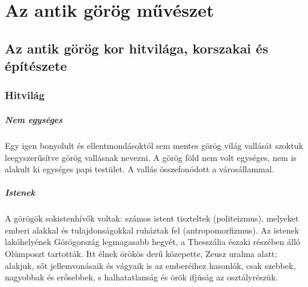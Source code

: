 \chapter{Az antik görög művészet}
\label{ch:2_antik_gorog}

\section{Az antik görög kor hitvilága, korszakai és építészete}


\clearpage

\subsection*{Hitvilág}

\paragraph{Nem egységes} 
Egy igen bonyolult és ellentmondásoktól sem mentes görög világ vallását szoktuk leegyszerűsítve görög vallásnak nevezni. A görög föld nem volt egységes, nem is alakult ki egységes papi testület. A vallás összefonódott a városállammal.

\paragraph{Istenek}
A görögök sokistenhívők voltak: számos istent tiszteltek (politeizmus), melyeket emberi alakkal és tulajdonságokkal ruháztak fel (antropomorfizmus). Az istenek lakóhelyének Görögország legmagasabb hegyét, a Thesszália északi részében álló Olümposzt tartották. Itt élnek örökös derű közepette, Zeusz uralma alatt; alakjuk, sőt jellemvonásaik és vágyaik is az emberéihez hasonlók, csak szebbek, nagyobbak és erősebbek, s halhatatlanság és örök ifjúság az osztályrészük.

